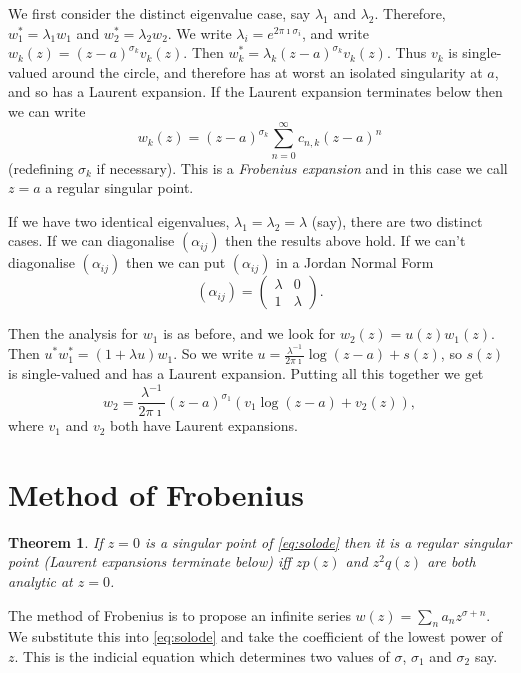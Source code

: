 \documentclass{notes}
\theoremstyle{plain}
\newtheorem*{theorem}{Theorem}
\begin{document}
We first consider the distinct eigenvalue case, say $\lambda_1$ and
$\lambda_2$.  Therefore, $w_1^\ast = \lambda_1 w_1$ and
$w_2^\ast = \lambda_2 w_2$.  We write $\lambda_i = e^{2 \pi \imath
\sigma_i}$, and write $w_k(z) = \left( z-a \right)^{\sigma_k} v_k(z)$.
Then $w_k^\ast = \lambda_k \left( z-a \right)^{\sigma_k} v_k(z)$.  Thus
$v_k$ is single-valued around the circle, and therefore has at worst an
isolated singularity at $a$, and so has a Laurent expansion.  If
the Laurent expansion terminates below then we can write
\[
w_k(z) = \left( z - a \right)^{\sigma_k} \sum_{n=0}^\infty c_{n,k}
\left( z - a \right)^n
\]
(redefining $\sigma_k$ if necessary).  This is
a \emph{Frobenius expansion} and in this case we call $z=a$ a regular
singular point.

If we have two identical eigenvalues, $\lambda_1 = \lambda_2 = \lambda$
(say), there are two distinct cases.  If we can diagonalise
$\left( \alpha_{i j} \right)$ then the results above hold.  If we
can't diagonalise $\left( \alpha_{i j} \right)$ then we can put
$\left( \alpha_{i j} \right)$ in a Jordan Normal Form
\[
\left( \alpha_{i j} \right) =
\begin{pmatrix} \lambda & 0 \\ 1 & \lambda \end{pmatrix}.
\]

Then the analysis for $w_1$ is as before, and we look for
$w_2(z) = u(z) w_1(z)$.  Then $u^\ast w_1^\ast = \left( 1 + \lambda u \right)
w_1$.  So we write $u = \frac{\lambda^{-1}}{2 \pi \imath}
\log \left( z - a\right) + s(z)$, so $s(z)$ is single-valued and has
a Laurent expansion.  Putting all this together we get
\[
w_2 = \frac{\lambda^{-1}}{2 \pi \imath} \left( z - a\right)^{\sigma_1}
\left(v_1 \log \left( z - a\right) + v_2(z) \right),
\]
where $v_1$ and $v_2$ both have Laurent expansions.

\section{Method of Frobenius}

\begin{theorem}
If $z=0$ is a singular point of \eqref{eq:solode} then it is a
regular singular point (Laurent expansions terminate below) iff
$z p(z)$ and $z^2 q(z)$ are both analytic at $z=0$.
\end{theorem}

The method of Frobenius is to propose an infinite series
$w(z) = \sum_n a_n z^{\sigma + n}$.  We substitute this into \eqref{eq:solode}
and take the coefficient of the lowest power of $z$.  This is the indicial
equation which determines two values of $\sigma$, $\sigma_1$ and $\sigma_2$
say.
\end{document}
